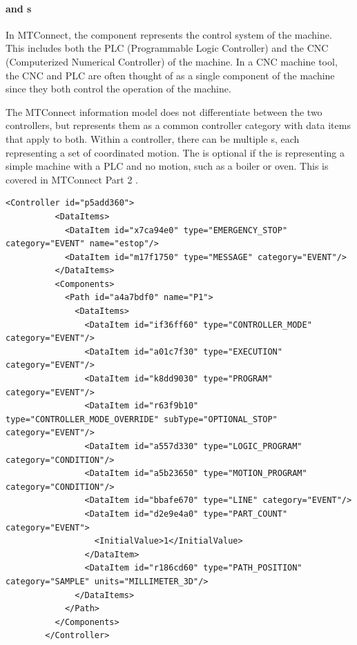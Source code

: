 \paragraph{ and  s}

In MTConnect, the  component represents the control system of the machine. This includes both the PLC (Programmable Logic Controller) and the CNC (Computerized Numerical Controller) of the machine. In a CNC machine tool, the CNC and PLC are often thought of as a single component of the machine since they both control the operation of the machine.

The MTConnect information model does not differentiate between the two controllers, but represents them as a common controller category with data items that apply to both. Within a controller, there can be multiple s, each representing a set of coordinated motion. The  is optional if the  is representing a simple machine with a PLC and no motion, such as a boiler or oven. This is covered in MTConnect Part 2 \cite{MTCPart2}.

\begin{lstlisting}[firstnumber=last,%
    caption={Controller and Path Components and Their Data Items},label={lst:controller-component}]
        <Controller id="p5add360">
          <DataItems>
            <DataItem id="x7ca94e0" type="EMERGENCY_STOP" category="EVENT" name="estop"/>
            <DataItem id="m17f1750" type="MESSAGE" category="EVENT"/>
          </DataItems>
          <Components>
            <Path id="a4a7bdf0" name="P1">
              <DataItems>
                <DataItem id="if36ff60" type="CONTROLLER_MODE" category="EVENT"/>
                <DataItem id="a01c7f30" type="EXECUTION" category="EVENT"/>
                <DataItem id="k8dd9030" type="PROGRAM" category="EVENT"/>
                <DataItem id="r63f9b10" type="CONTROLLER_MODE_OVERRIDE" subType="OPTIONAL_STOP" category="EVENT"/>
                <DataItem id="a557d330" type="LOGIC_PROGRAM" category="CONDITION"/>
                <DataItem id="a5b23650" type="MOTION_PROGRAM" category="CONDITION"/>
                <DataItem id="bbafe670" type="LINE" category="EVENT"/>
                <DataItem id="d2e9e4a0" type="PART_COUNT" category="EVENT">
                  <InitialValue>1</InitialValue>
                </DataItem>
                <DataItem id="r186cd60" type="PATH_POSITION" category="SAMPLE" units="MILLIMETER_3D"/>
              </DataItems>
            </Path>
          </Components>
        </Controller>
\end{lstlisting}

